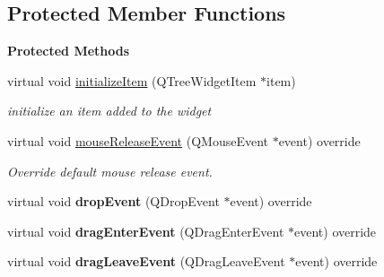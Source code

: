 \subsection*{Protected Member Functions}
\begin{Indent}\textbf{ Protected Methods}\par
\begin{DoxyCompactItemize}
\item 
\mbox{\label{classrev_1_1_view_1_1_tree_widget_a871921727165f85fc534211d812fb430}} 
virtual void \mbox{\hyperlink{classrev_1_1_view_1_1_tree_widget_a871921727165f85fc534211d812fb430}{initialize\+Item}} (Q\+Tree\+Widget\+Item $\ast$item)
\begin{DoxyCompactList}\small\item\em initialize an item added to the widget \end{DoxyCompactList}\item 
\mbox{\label{classrev_1_1_view_1_1_tree_widget_a2350cc18cb9c1d454dfd0a05db1a8759}} 
virtual void \mbox{\hyperlink{classrev_1_1_view_1_1_tree_widget_a2350cc18cb9c1d454dfd0a05db1a8759}{mouse\+Release\+Event}} (Q\+Mouse\+Event $\ast$event) override
\begin{DoxyCompactList}\small\item\em Override default mouse release event. \end{DoxyCompactList}\item 
\mbox{\label{classrev_1_1_view_1_1_tree_widget_a3d3a1ba2f77f86f33337aed41aca6bee}} 
virtual void {\bfseries drop\+Event} (Q\+Drop\+Event $\ast$event) override
\item 
\mbox{\label{classrev_1_1_view_1_1_tree_widget_a05cff85328e1778f6e5b18a19039f5c0}} 
virtual void {\bfseries drag\+Enter\+Event} (Q\+Drag\+Enter\+Event $\ast$event) override
\item 
\mbox{\label{classrev_1_1_view_1_1_tree_widget_a7ba477161eb2fe7f81d054fb9fe37e61}} 
virtual void {\bfseries drag\+Leave\+Event} (Q\+Drag\+Leave\+Event $\ast$event) override
\item 
\mbox{\label{classrev_1_1_view_1_1_tree_widget_a288f7bcbd376bc3fb33aa4e9168447e8}} 

\end{DoxyCompactItemize}
\end{Indent}
